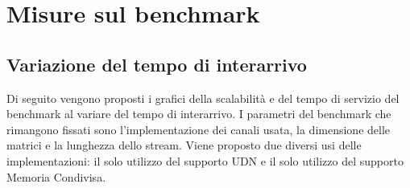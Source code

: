 \documentclass[a4paper]{article}
\begin{document}


\newpage 
\FloatBarrier
\section{Misure sul benchmark}
\subsection{Variazione del tempo di interarrivo}
Di seguito vengono proposti i grafici della scalabilit\`a e del tempo di servizio del benchmark al variare del tempo di interarrivo. I parametri del benchmark che rimangono fissati sono l'implementazione dei canali usata, la dimensione delle matrici e la lunghezza dello stream. Viene proposto due diversi usi delle implementazioni: il solo utilizzo del supporto UDN e il solo utilizzo del supporto Memoria Condivisa.
\end{document}
